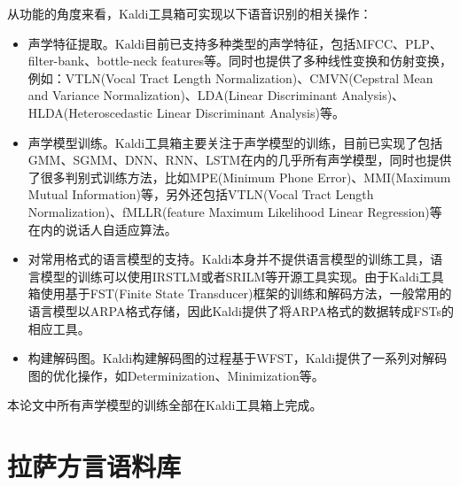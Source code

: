 从功能的角度来看，Kaldi工具箱可实现以下语音识别的相关操作：
\begin{itemize}
  \item 声学特征提取。Kaldi目前已支持多种类型的声学特征，包括MFCC、PLP、filter-bank、bottle-neck features等。同时也提供了多种线性变换和仿射变换，例如：VTLN(Vocal Tract Length Normalization)、CMVN(Cepstral Mean and Variance Normalization)、LDA(Linear Discriminant Analysis)、HLDA(Heteroscedastic Linear Discriminant Analysis)等。
  \item 声学模型训练。Kaldi工具箱主要关注于声学模型的训练，目前已实现了包括GMM、SGMM、DNN、RNN、LSTM在内的几乎所有声学模型，同时也提供了很多判别式训练方法，比如MPE(Minimum Phone Error)、MMI(Maximum Mutual Information)等，另外还包括VTLN(Vocal Tract Length Normalization)、fMLLR(feature Maximum Likelihood Linear Regression)等在内的说话人自适应算法。
  \item 对常用格式的语言模型的支持。Kaldi本身并不提供语言模型的训练工具，语言模型的训练可以使用IRSTLM或者SRILM等开源工具实现。由于Kaldi工具箱使用基于FST(Finite State Transducer)框架的训练和解码方法，一般常用的语言模型以ARPA格式存储，因此Kaldi提供了将ARPA格式的数据转成FSTs的相应工具。
  \item 构建解码图。Kaldi构建解码图的过程基于WFST\cite{mohri2002weighted}，Kaldi提供了一系列对解码图的优化操作，如Determinization、Minimization等。
\end{itemize}

本论文中所有声学模型的训练全部在Kaldi工具箱上完成。

\section{拉萨方言语料库}



